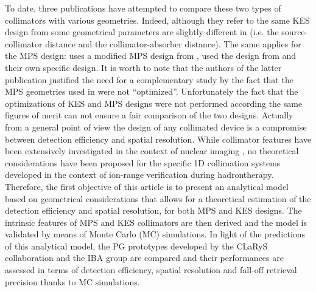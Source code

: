 \documentclass[a4paper,english,12pt]{article}
\begin{document}
To date, three publications \citep{Smeets2016, Lin2017, Park2017} have attempted to compare these two types of collimators with various geometries. Indeed, although they refer to the same KES design from \citep{Perali2014} some geometrical parameters are slightly different in \citep{Lin2017, Park2017} (i.e. the source-collimator distance and the collimator-absorber distance). The same applies for the MPS design: \cite{Smeets2016} uses a modified MPS design from \cite{Pinto2014a}, \cite{Lin2017} used the design from \cite{Gueth2013} and \cite{Park2017} their own specific design. It is worth to note that the authors of the latter publication justified the need for a complementary study by the fact that the MPS geometries used in \cite{Smeets2016, Lin2017} were not \enquote{optimized}. 
Unfortunately the fact that the optimizations of KES and MPS designs were not performed according the same figures of merit can not ensure a fair comparison of the two designs. Actually from a general point of view the design of any collimated device is a compromise between detection efficiency and spatial resolution. While collimator features have been extensively investigated in the context of nuclear imaging \citep{Gunter2004}, no theoretical considerations have been proposed for the specific 1D collimation systems developed in the context of ion-range verification during hadrontherapy.
Therefore, the first objective of this article is to present an analytical model based on geometrical considerations that allows for a theoretical estimation of the detection efficiency and spatial resolution, for both MPS and KES designs. The intrinsic features of MPS and KES collimators are then derived and the model is validated by means of Monte Carlo (MC) simulations. In light of the predictions of this analytical model, the PG prototypes developed by the CLaRyS collaboration \citep{Pinto2014a, Krimmer2015} and the IBA group \citep{Perali2014} are compared and their performances are assessed in terms of detection efficiency, spatial resolution and fall-off retrieval precision thanks to MC simulations.

\end{document}
